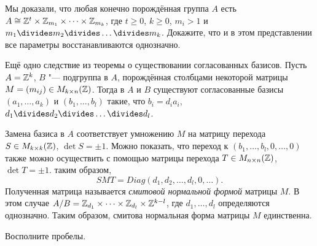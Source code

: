 \documentclass[main]{subfiles}
\begin{document}
\begin{exercise}
  Мы доказали, что любая конечно порождённая группа \( A \)
  есть \( A \cong \mathbb{Z}^t \times \mathbb{Z}_{m_1} \times
  \dots \times \mathbb{Z}_{m_k} \), где \( t \ge 0 \),
  \( k \ge 0 \), \( m_i > 1 \) и \( m_1 \divides m_2 \divides
  \dots \divides m_k \).
  Докажите, что и в этом представлении все параметры
  восстанавливаются однозначно.
\end{exercise}
\begin{remark}
  Ещё одно следствие из теоремы о существовании согласованных базисов.
  Пусть \( A = \mathbb{Z}^k \), \( B \) "--- подгруппа в \( A \),
  порождённая столбцами  некоторой матрицы \( M = (m_{ij}) \in
  \Matrices[\Integer]{k}{n} \).
  Тогда в \( A \) и \( B \) существуют согласованные базисы
  \( (a_1, \dots, a_k) \) и \( (b_1, \dots, b_l) \) такие, что
  \( b_i = d_i a_i \), \( d_1 \divides d_2 \divides \dots \divides d_l \).

  Замена базиса в \( A \) соответствует умножению \( M \) на матрицу
  перехода \( S \in \Matrices[\Integer]{k}{k} \), \( \det S = \pm 1 \).
  Можно показать, что переход к \( (b_1, \dots, b_l, 0, \dots, 0) \)
  также можно осуществить с помощью матрицы перехода
  \( T \in \Matrices[\Integer]{n}{n} \), \( \det T = \pm 1 \).
  таким образом,
  \[
    S M T = Diag(d_1, d_2, \dots, d_l, 0, \dots).
  \]
  Полученная матрица называется \emph{смитовой нормальной формой}
  матрицы \( M \).
  В этом случае \( \Factor{A}[B] = \Integer_{d_1} \times \dots
  \times \Integer_{d_l} \times \Integer^{k - l} \),
  где \( d_1, \dots, d_l \) определяются однозначно.
  Таким образом, смитова нормальная форма матрицы \( M \)
  единственна.
\end{remark}

\begin{exercise}
  Восполните пробелы.
\end{exercise}
\end{document}
